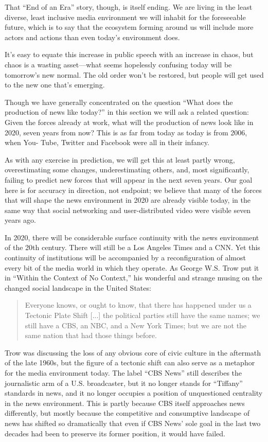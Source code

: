 That ``End of an Era'' story, though, is itself ending. We are living in the least
diverse, least inclusive media environment we will inhabit for the foreseeable
future, which is to say that the ecosystem forming around us will include more
actors and actions than even today’s environment does.

It’s easy to equate this increase in public speech with an increase in chaos, but
chaos is a wasting asset—what seems hopelessly confusing today will be tomorrow’s
new normal. The old order won’t be restored, but people will get used to
the new one that’s emerging.

Though we have generally concentrated on the question ``What does the production
of news like today?'' in this section we will ask a related question: Given
the forces already at work, what will the production of news look like in 2020,
seven years from now? This is as far from today as today is from 2006, when You-
Tube, Twitter and Facebook were all in their infancy.

As with any exercise in prediction, we will get this at least partly wrong, overestimating
some changes, underestimating others, and, most significantly, failing to
predict new forces that will appear in the next seven years. Our goal here is for
accuracy in direction, not endpoint; we believe that many of the forces that will
shape the news environment in 2020 are already visible today, in the same way
that social networking and user-distributed video were visible seven years ago.

In 2020, there will be considerable surface continuity with the news environment
of the 20th century. There will still be a Los Angeles Times and a CNN. Yet
this continuity of institutions will be accompanied by a reconfiguration of almost
every bit of the media world in which they operate. As George W.S. Trow put it
in ``Within the Context of No Context,'' his wonderful and strange musing on
the changed social landscape in the United States:

\begin{quote}
Everyone knows, or ought to know, that there has happened under us
a Tectonic Plate Shift [...] the political parties still have the same names;
we still have a CBS, an NBC, and a New York Times; but we are not the
same nation that had those things before.
\end{quote}

Trow was discussing the loss of any obvious core of civic culture in the aftermath
of the late 1960s, but the figure of a tectonic shift can also serve as a metaphor for
the media environment today. The label ``CBS News'' still describes the journalistic
arm of a U.S. broadcaster, but it no longer stands for ``Tiffany'' standards in
news, and it no longer occupies a position of unquestioned centrality in the news
environment. This is partly because CBS itself approaches news differently, but mostly because the competitive and consumptive landscape of news has shifted
so dramatically that even if CBS News’ sole goal in the last two decades had been
to preserve its former position, it would have failed.

